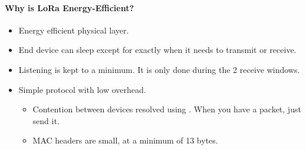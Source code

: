 \paragraph{Why is LoRa Energy-Efficient?}\label{par:Why_LoRa_Energy_Efficient}
\begin{itemize}[noitemsep]
\item Energy efficient physical layer.
\item End device can sleep except for exactly when it needs to transmit or receive.
\item Listening is kept to a minimum. It is only done during the 2 receive windows.
\item Simple protocol with low overhead.
  \begin{itemize}[noitemsep]
  \item Contention between devices resolved using . When you have a packet, just send it.
  \item MAC headers are small, at a minimum of 13 bytes.
  \end{itemize}
\end{itemize}

